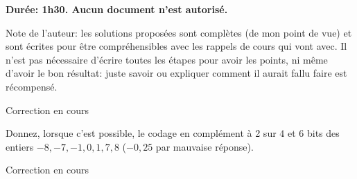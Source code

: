 \def\modulename{pcp}
\RequirePackage[utf8]{course}
\pcp
\newif\ifsolution
\solutiontrue
\usepackage{listings}

\lstset{language=C}

\usepackage{caption}
\usepackage{subcaption}
\usepackage{units}
\usepackage{Cdefs}
\usepackage{tikz}
\usetikzlibrary{arrows}


\def\consigne#1{\null\begin{center}\parbox{13cm}{\large #1}\end{center}\relax}

\def\Question#1#2{\question{}\textbf{(#2)} #1}
\ifsolution
{}
\else
\excludecomment{solution}
\fi


\controlecontinu

\consigne{{\bf Dur{\'e}e: 1h30. Aucun document n'est autorisé.}}

\begin{solution}
  Note de l'auteur: les solutions proposées sont complètes (de mon
  point de vue) et sont écrites pour être compréhensibles avec les
  rappels de cours qui vont avec. Il n'est pas nécessaire d'écrire
  toutes les étapes pour avoir les points, ni même d'avoir le bon
  résultat: juste savoir ou expliquer comment il aurait fallu faire
  est récompensé.
\end{solution}

\vspace*{1em}


\begin{solution}
  Correction en cours
\end{solution}

\question Donnez, lorsque c'est possible, le codage en complément à 2
sur \(4\) et \(6\) bits des entiers \(-8,-7,-1,0,1,7,8\) (\(-0,25\)
par mauvaise réponse).



\begin{solution}
  Correction en cours
\end{solution}

